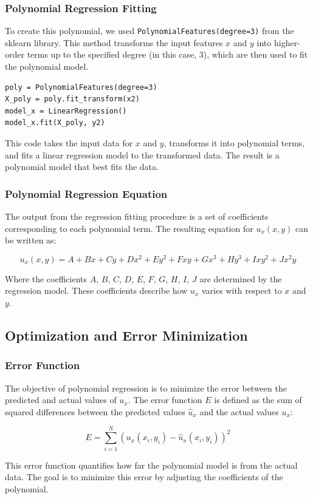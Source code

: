 \documentclass[fleqn,10pt]{olplainarticle}
\begin{document}
\subsubsection{Polynomial Regression Fitting}
To create this polynomial, we used \texttt{PolynomialFeatures(degree=3)} from the sklearn library. This method transforms the input features $x$ and $y$ into higher-order terms up to the specified degree (in this case, 3), which are then used to fit the polynomial model.

\begin{verbatim}
poly = PolynomialFeatures(degree=3)
X_poly = poly.fit_transform(x2)
model_x = LinearRegression()
model_x.fit(X_poly, y2)
\end{verbatim}

This code takes the input data for $x$ and $y$, transforms it into polynomial terms, and fits a linear regression model to the transformed data. The result is a polynomial model that best fits the data.

\subsubsection{Polynomial Regression Equation}
The output from the regression fitting procedure is a set of coefficients corresponding to each polynomial term. The resulting equation for $u_x(x, y)$ can be written as:

\[
u_x(x, y) = A + Bx + Cy + Dx^2 + Ey^2 + Fxy + Gx^3 + Hy^3 + Ixy^2 + Jx^2y
\]

Where the coefficients $A$, $B$, $C$, $D$, $E$, $F$, $G$, $H$, $I$, $J$ are determined by the regression model. These coefficients describe how $u_x$ varies with respect to $x$ and $y$.
\subsection{Optimization and Error Minimization}
\subsubsection{Error Function}
The objective of polynomial regression is to minimize the error between the predicted and actual values of $u_x$. The error function $E$ is defined as the sum of squared differences between the predicted values $\hat{u}_x$ and the actual values $u_x$:

\[
E = \sum_{i=1}^{N} \left( u_x(x_i, y_i) - \hat{u}_x(x_i, y_i) \right)^2
\]

This error function quantifies how far the polynomial model is from the actual data. The goal is to minimize this error by adjusting the coefficients of the polynomial.
\end{document}
